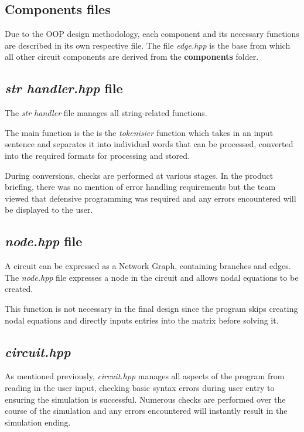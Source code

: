 \documentclass[12pt,a4paper]{article}
\begin{document}
	\subsection{Components files}
	Due to the OOP design methodology, each component and its necessary functions are described in its own
	respective file. The file \textit{edge.hpp} is the base from which all other circuit components are derived
	from the \textbf{components} folder. 
	\subsection{\textit{str handler.hpp} file}
	The \textit{str handler} file manages all string-related functions. \par
	The main function is the is the \textit{tokenisier} function which takes in an 
	input sentence and separates it into individual words that can be processed, 
	converted into the required formats for processing and stored. \par
	During conversions, checks are performed at various stages. In the product briefing, there
	was no mention of error handling requirements but the team viewed that defensive programming 
	was required and any errors encountered will be displayed to the user. 

	\subsection{\textit{node.hpp} file}
	A circuit can be expressed as a Network Graph, containing branches and edges.
	The \textit{node.hpp} file expresses a node in the circuit and allows nodal equations
	to be created.\par
	This function is not necessary in the final design since the program skips creating nodal
	equations and directly inputs entries into the matrix before solving it.
	\pagebreak
	\subsection{\textit{circuit.hpp}}
	As mentioned previously, \textit{circuit.hpp} manages all aspects of the program from 
	reading in the user input, checking basic syntax errors during user entry 
	to ensuring the simulation is successful.
	Numerous checks are performed over the course of the simulation and any errors encountered
	will instantly result in the simulation ending. \par
	
\end{document}
